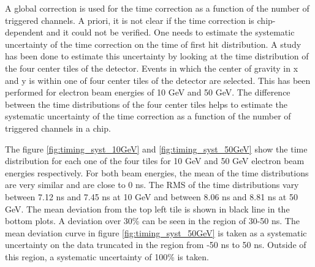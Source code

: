 A global correction is used for the time correction as a function of the number of triggered channels. A priori, it is not clear if the time correction is chip-dependent and it could not be verified. One needs to estimate the systematic uncertainty of the time correction on the time of first hit distribution. A study has been done to estimate this uncertainty by looking at the time distribution of the four center tiles of the detector. Events in which the center of gravity in x and y is within one of four center tiles of the detector are selected. This has been performed for electron beam energies of 10 GeV and 50 GeV. The difference between the time distributions of the four center tiles helps to estimate the systematic uncertainty of the time correction as a function of the number of triggered channels in a chip.

The figure \ref{fig:timing_syst_10GeV} and \ref{fig:timing_syst_50GeV} show the time distribution for each one of the four tiles for 10 GeV and 50 GeV electron beam energies respectively. For both beam energies, the mean of the time distributions are very similar and are close to 0 ns. The RMS of the time distributions vary between 7.12 ns and 7.45 ns at 10 GeV and between 8.06 ns and 8.81 ns at 50 GeV. The mean deviation from the top left tile is shown in black line in the bottom plots. A deviation over 30\% can be seen in the region of 30-50 ns. The mean deviation curve in figure \ref{fig:timing_syst_50GeV} is taken as a systematic uncertainty on the data truncated in the region from -50 ns to 50 ns. Outside of this region, a systematic uncertainty of 100\% is taken.

